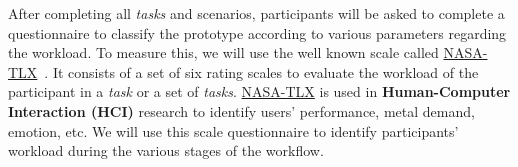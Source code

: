 After completing all \textit{tasks} and scenarios, participants will be asked to complete a questionnaire to classify the prototype according to various parameters regarding the workload. To measure this, we will use the well known scale called \hyperlink{https://en.wikipedia.org/wiki/NASA-TLX}{NASA-TLX}~\cite{ramkumar2017using}. It consists of a set of six rating scales to evaluate the workload of the participant in a \textit{task} or a set of \textit{tasks}. \hyperlink{https://en.wikipedia.org/wiki/NASA-TLX}{NASA-TLX} is used in \textbf{Human-Computer Interaction (HCI)} research to identify users' performance, metal demand, emotion, etc. We will use this scale questionnaire to identify participants' workload during the various stages of the workflow.

